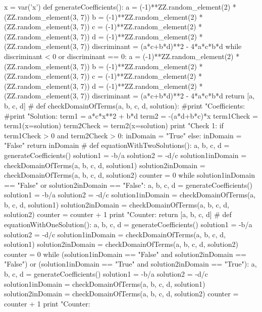 \documentclass{ximera}
\begin{document}
\begin{sagesilent}
x = var('x')
def generateCoefficients(): 
    a = (-1)**ZZ.random_element(2) * (ZZ.random_element(3, 7))
    b = (-1)**ZZ.random_element(2) * (ZZ.random_element(3, 7))
    c = (-1)**ZZ.random_element(2) * (ZZ.random_element(3, 7))
    d = (-1)**ZZ.random_element(2) * (ZZ.random_element(3, 7))
    discriminant = (a*c+b*d)**2 - 4*a*c*b*d
    while discriminant < 0 or discriminant == 0:
        a = (-1)**ZZ.random_element(2) * (ZZ.random_element(3, 7))
        b = (-1)**ZZ.random_element(2) * (ZZ.random_element(3, 7))
        c = (-1)**ZZ.random_element(2) * (ZZ.random_element(3, 7))
        d = (-1)**ZZ.random_element(2) * (ZZ.random_element(3, 7))
        discriminant = (a*c+b*d)**2 - 4*a*c*b*d
    return [a, b, c, d]
#  
def checkDomainOfTerms(a, b, c, d, solution):
    #print "Coefficients: %
    #print "Solution: %
    term1 = a*c*x**2 + b*d
    term2 = -(a*d+b*c)*x
    term1Check = term1(x=solution)
    term2Check = term2(x=solution)
    print "Check 1: %
    if term1Check > 0 and term2Check > 0:
        inDomain = "True"
    else:
        inDomain = "False"
    return inDomain
#
def equationWithTwoSolutions():
    a, b, c, d = generateCoefficients()
    solution1 = -b/a
    solution2 = -d/c
    solution1inDomain = checkDomainOfTerms(a, b, c, d, solution1)
    solution2inDomain = checkDomainOfTerms(a, b, c, d, solution2)
    counter = 0
    while solution1inDomain == "False" or solution2inDomain == "False":
        a, b, c, d = generateCoefficients()
        solution1 = -b/a
        solution2 = -d/c
        solution1inDomain = checkDomainOfTerms(a, b, c, d, solution1)
        solution2inDomain = checkDomainOfTerms(a, b, c, d, solution2)
        counter = counter + 1 
        print "Counter: %
    return [a, b, c, d]
#
def equationWithOneSolution():
    a, b, c, d = generateCoefficients()
    solution1 = -b/a
    solution2 = -d/c
    solution1inDomain = checkDomainOfTerms(a, b, c, d, solution1)
    solution2inDomain = checkDomainOfTerms(a, b, c, d, solution2)
    counter = 0
    while (solution1inDomain == "False" and solution2inDomain == "False") or (solution1inDomain == "True" and solution2inDomain == "True"):
        a, b, c, d = generateCoefficients()
        solution1 = -b/a
        solution2 = -d/c
        solution1inDomain = checkDomainOfTerms(a, b, c, d, solution1)
        solution2inDomain = checkDomainOfTerms(a, b, c, d, solution2)
        counter = counter + 1 
        print "Counter: %

\end{sagesilent}
\end{document}
